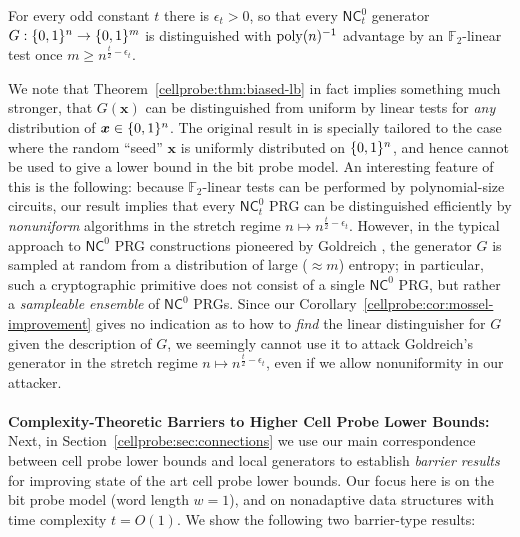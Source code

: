 \begin{corollary}

For every odd constant $t$ there is $\epsilon_t>0$, so that every $\mathsf{NC}^0_t$ generator $G: \{0,1\}^n \to \{0,1\}^m$ is distinguished with $\mathrm{poly}(n)^{-1}$ advantage by an $\mathbb{F}_2$-linear test once $m \geq n^{\frac{t}{2} - \epsilon_t}$.
\end{corollary}
We note that Theorem~\ref{cellprobe:thm:biased-lb} in fact implies something much stronger, that $G(\bm{x})$ can be distinguished from uniform by linear tests for \emph{any} distribution of $\bm{x} \in \{0,1\}^n$. The original result in \cite{mossel-epsilon} is specially tailored to the case where the random ``seed'' $\bm{x}$ is uniformly distributed on $\{0,1\}^n$, and hence cannot be used to give a lower bound in the bit probe model. 
An interesting feature of this is the following: because $\mathbb{F}_2$-linear tests can be performed by polynomial-size circuits, our result implies that every $\mathsf{NC}^0_t$ PRG can be distinguished efficiently by \emph{nonuniform} algorithms in the stretch regime $n \mapsto n^{\frac{t}{2} - \epsilon_t}$. However, in the typical approach to $\mathsf{NC}^0$ PRG constructions pioneered by Goldreich \cite{goldreich-prg}, the generator $G$ is sampled at random from a distribution of large ($\approx m$) entropy; in particular, such a cryptographic primitive does not consist of a single $\mathsf{NC}^0$ PRG, but rather a \emph{sampleable ensemble} of $\mathsf{NC}^0$ PRGs. Since our Corollary~\ref{cellprobe:cor:mossel-improvement} gives no indication as to how to \emph{find} the linear distinguisher for $G$ given the description of $G$, we seemingly cannot use it to attack Goldreich's generator in the stretch regime $n \mapsto n^{\frac{t}{2} - \epsilon_t}$, even if we allow nonuniformity in our attacker.
~\\~\\
{\bf \noindent Complexity-Theoretic Barriers to Higher Cell Probe Lower Bounds:}
Next, in Section~\ref{cellprobe:sec:connections} we use our main correspondence between cell probe lower bounds and local generators to establish \emph{barrier results} for improving state of the art cell probe lower bounds. Our focus here is on the bit probe model (word length $w=1$), and on nonadaptive data structures with time complexity $t =O(1)$. We show the following two barrier-type results:

%  

